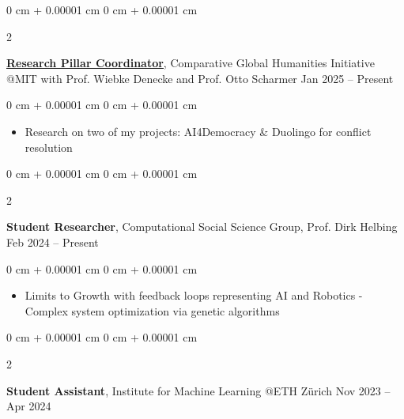 \documentclass[10pt, letterpaper]{article}
\newenvironment{highlights}{
    \begin{itemize}[
        topsep=0.10 cm,
        parsep=0.10 cm,
        partopsep=0pt,
        itemsep=0pt,
        leftmargin=0 cm + 10pt
    ]
}{
    \end{itemize}
} %
\newenvironment{onecolentry}{
    \begin{adjustwidth}{
        0 cm + 0.00001 cm
    }{
        0 cm + 0.00001 cm
    }
}{
    \end{adjustwidth}
} %
\newenvironment{twocolentry}[2][]{
    \onecolentry
    \def\secondColumn{#2}
    \setcolumnwidth{\fill, 4.5 cm}
    \begin{paracol}{2}
}{
    \switchcolumn \raggedleft \secondColumn
    \end{paracol}
    \endonecolentry
} %
\begin{document}


         \begin{twocolentry}{
                    Jan 2025 – Present
                }
                    \href{https://comparativeglobalhumanities.mit.edu/people/gabor-hollbeck/}{\underline{\textbf{Research Pillar Coordinator}}}, Comparative Global Humanities Initiative @MIT with Prof. Wiebke Denecke and Prof. Otto Scharmer\end{twocolentry}

                      \begin{onecolentry}
            \begin{highlights}
                \item Research on two of my projects: AI4Democracy \& Duolingo for conflict resolution


            \end{highlights}
        \end{onecolentry}
        
                \vspace{0.10 cm}




                \vspace{0.2 cm}
        
        \begin{twocolentry}{
            Feb 2024 – Present
        }
            \textbf{Student Researcher}, Computational Social Science Group, Prof. Dirk Helbing\end{twocolentry}

        \vspace{0.10 cm}
        \begin{onecolentry}
            \begin{highlights}
                \item Limits to Growth with feedback loops representing AI and Robotics - \\Complex system optimization via genetic algorithms

            \end{highlights}
        \end{onecolentry}

        \vspace{0.2 cm}

        \begin{twocolentry}{
            Nov 2023 – Apr 2024
        }
            \textbf{Student Assistant}, Institute for Machine Learning @ETH Zürich\end{twocolentry}
\end{document}
